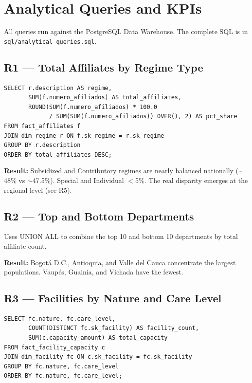 \documentclass[12pt,a4paper]{article}
\begin{document}
\section{Analytical Queries and KPIs}

All queries run against the PostgreSQL Data Warehouse. The complete SQL is in \texttt{sql/analytical\_queries.sql}.

\subsection{R1 --- Total Affiliates by Regime Type}

\begin{lstlisting}
SELECT r.description AS regime,
       SUM(f.numero_afiliados) AS total_affiliates,
       ROUND(SUM(f.numero_afiliados) * 100.0
             / SUM(SUM(f.numero_afiliados)) OVER(), 2) AS pct_share
FROM fact_affiliates f
JOIN dim_regime r ON f.sk_regime = r.sk_regime
GROUP BY r.description
ORDER BY total_affiliates DESC;
\end{lstlisting}

\textbf{Result:} Subsidized and Contributory regimes are nearly balanced nationally ($\sim$48\% vs $\sim$47.5\%). Special and Individual $<$5\%. The real disparity emerges at the regional level (see R5).

\subsection{R2 --- Top and Bottom Departments}

Uses UNION ALL to combine the top 10 and bottom 10 departments by total affiliate count.

\textbf{Result:} Bogot\'{a} D.C., Antioquia, and Valle del Cauca concentrate the largest populations. Vaup\'{e}s, Guain\'{i}a, and Vichada have the fewest.

\subsection{R3 --- Facilities by Nature and Care Level}

\begin{lstlisting}
SELECT fc.nature, fc.care_level,
       COUNT(DISTINCT fc.sk_facility) AS facility_count,
       SUM(c.capacity_amount) AS total_capacity
FROM fact_facility_capacity c
JOIN dim_facility fc ON c.sk_facility = fc.sk_facility
GROUP BY fc.nature, fc.care_level
ORDER BY fc.nature, fc.care_level;
\end{lstlisting}
\end{document}
